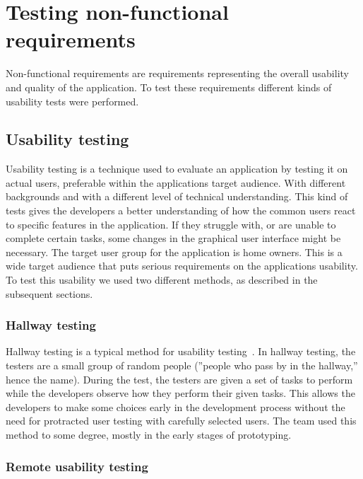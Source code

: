 \section{Testing non-functional requirements}
\label{sec:testingnonfunctionalrequirements}
Non-functional requirements are requirements representing the overall usability and quality of the application. To test these requirements different kinds of usability tests were performed.

\subsection{Usability testing}
\label{sec:userTest}
Usability testing is a technique used to evaluate an application by testing it on actual users, preferable within the applications target audience. With different backgrounds and with a different level of technical understanding. This kind of tests gives the developers a better understanding of how the common users react to specific features in the application. If they struggle with, or are unable to complete certain tasks, some changes in the graphical user interface might be necessary.
The target user group for the application is home owners. This is a wide target audience that puts serious requirements on the applications usability. To test this usability we used two different methods, as described in the subsequent sections.

\subsubsection{Hallway testing}
Hallway testing is a typical method for usability testing~\cite{hallwaytesting}. In hallway testing, the testers are a small group of random people (''people who pass by in the hallway,'' hence the name). During the test, the testers are given a set of tasks to perform while the developers observe how they perform their given tasks. This allows the developers to make some choices early in the development process without the need for protracted user testing with carefully selected users. 
The team used this method to some degree, mostly in the early stages of prototyping.

\subsubsection{Remote usability testing}

